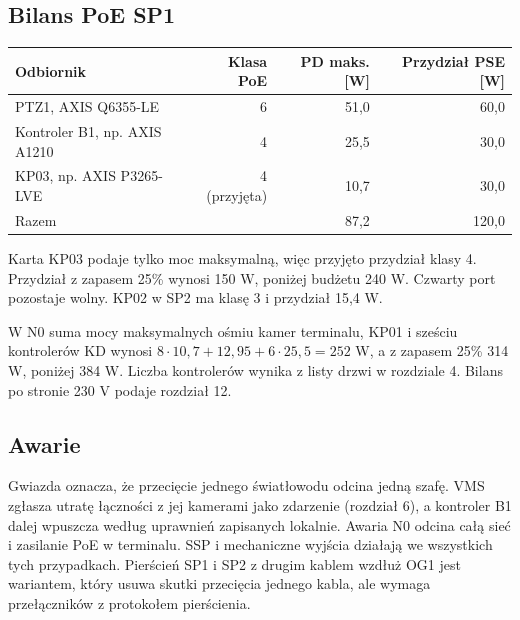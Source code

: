 \subsection*{Bilans PoE SP1}
\begin{center}
\small
\begin{tabular}{@{}lrrr@{}}
\toprule
Odbiornik & Klasa PoE & PD maks. [W] & Przydział PSE [W] \\
\midrule
PTZ1, AXIS Q6355-LE & 6 & 51,0 & 60,0 \\
Kontroler B1, np. AXIS A1210 & 4 & 25,5 & 30,0 \\
KP03, np. AXIS P3265-LVE & 4 (przyjęta) & 10,7 & 30,0 \\
\midrule
Razem & & 87,2 & 120,0 \\
\bottomrule
\end{tabular}
\end{center}
Karta KP03 podaje tylko moc maksymalną, więc przyjęto przydział klasy 4. Przydział z zapasem 25\% wynosi 150 W, poniżej budżetu 240 W. Czwarty port pozostaje wolny. KP02 w SP2 ma klasę 3 i przydział 15,4 W.\cite{S-Q6355,S-KD,S-CAM,S-Q1972}

W N0 suma mocy maksymalnych ośmiu kamer terminalu, KP01 i sześciu kontrolerów KD wynosi $8\cdot10{,}7+12{,}95+6\cdot25{,}5=252$ W, a z zapasem 25\% 314 W, poniżej 384 W. Liczba kontrolerów wynika z listy drzwi w rozdziale 4. Bilans po stronie 230 V podaje rozdział 12.

\subsection*{Awarie}
Gwiazda oznacza, że przecięcie jednego światłowodu odcina jedną szafę. VMS zgłasza utratę łączności z jej kamerami jako zdarzenie (rozdział 6), a kontroler B1 dalej wpuszcza według uprawnień zapisanych lokalnie.\cite{S-KD} Awaria N0 odcina całą sieć i zasilanie PoE w terminalu. SSP i mechaniczne wyjścia działają we wszystkich tych przypadkach. Pierścień SP1 i SP2 z drugim kablem wzdłuż OG1 jest wariantem, który usuwa skutki przecięcia jednego kabla, ale wymaga przełączników z protokołem pierścienia.
